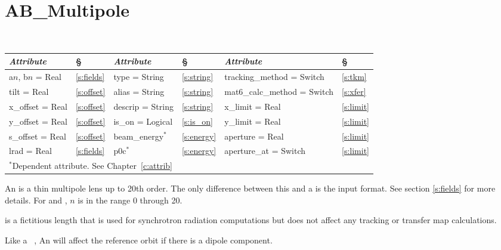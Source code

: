 \vfil
\break

\section{AB\_Multipole}
\label{s:ab_m}

\begin{center}
\tt 
\begin{tabular}{|l|l||l|l||l|l|} \hline
  {\sl Attribute} & \S  & {\sl Attribute} & \S & {\sl Attribute} & \S \\ \hline
  a$n$, b$n$ = Real  &  \ref{s:fields} &  type = String    & \ref{s:string} & tracking\_method = Switch    & \ref{s:tkm}   \\ \hline
  tilt       = Real  &  \ref{s:offset} &  alias = String   & \ref{s:string} & mat6\_calc\_method = Switch  & \ref{s:xfer}  \\ \hline
  x\_offset  = Real  &  \ref{s:offset} &  descrip = String & \ref{s:string} & x\_limit = Real              & \ref{s:limit} \\ \hline
  y\_offset  = Real  &  \ref{s:offset} &  is\_on = Logical & \ref{s:is_on}  & y\_limit = Real              & \ref{s:limit} \\ \hline
  s\_offset  = Real  &  \ref{s:offset} &  beam\_energy$^*$ & \ref{s:energy} & aperture = Real              & \ref{s:limit} \\ \hline
  lrad       = Real  &  \ref{s:fields} &  p0c$^*$          & \ref{s:energy} & aperture\_at = Switch        & \ref{s:limit} \\ \hline
  \multicolumn{6}{l}{\small $^*$Dependent attribute. See Chapter~\ref{c:attrib}} \\
\end{tabular}
\end{center}
\toffset

An  is a thin multipole lens up to 20th order. The only
difference between this and a  is the input format. See
section \ref{s:fields} for more details. For 
and , $n$ is in the range 0 through 20.

 is a fictitious length that is used for synchrotron radiation
computations but does not affect any tracking or transfer map calculations. 

Like a \mad\ , An  will affect the
reference orbit if there is a dipole component. 

